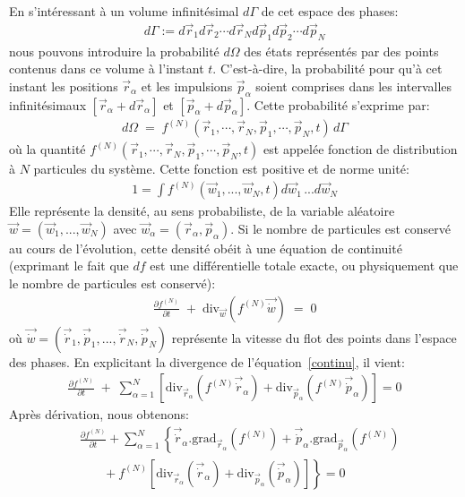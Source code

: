En s'intéressant à un volume infinitésimal $d\Gamma$ de cet espace des phases:
\begin{align*}
	d\Gamma:=d\vec{r}_{1}d\vec{r}_{2}\cdots d\vec{r}_{N}d\vec{p}_{1}d\vec{p}_{2}\cdots d\vec{p}_{N}
\end{align*}
nous pouvons introduire la probabilité $d\Omega$ des états représentés par des points contenus dans ce volume à l'instant $t$. C'est-à-dire, la probabilité
pour qu'à cet instant les positions $\vec{r}_{\alpha}$ et les {impulsion}s $\vec{p}_{\alpha}$ soient comprises dans les intervalles
infinitésimaux $[\vec{r}_{\alpha }+d\vec{r}_{\alpha}]$ et $[\vec{p}_{\alpha}+d\vec{p}_{\alpha}]$. Cette probabilité s'exprime
par:
\begin{align*}
	d\Omega\;=\;f^{(N)}(\vec{r}_{1},\cdots,\vec{r}_{N},\vec{p}_{1},\cdots,\vec{p}_{N},t)\,d\Gamma
\end{align*}
où la quantité $f^{(N)}(\vec{r}_{1},\cdots,\vec{r} _{N},\vec{p}_{1},\cdots,\vec{p}_{N},t)$ est appelée fonction de distribution à $N$
particules du système. Cette fonction est positive et de norme unité:
\begin{align*}
	1=\int f^{\left(N\right)}\left(\vec{w}_{1},...,\vec{w}_{N},t\right)d\vec{w}_{1}\,...d\vec{w}_{N}
\end{align*}
Elle représente la densité, au sens probabiliste, de la variable aléatoire $\vec{w}=(\vec{w}_{1},...,\vec{w}_{N})$ avec
$\vec{w}_{\alpha}=\left(  \vec{r}_{\alpha},\vec{p}_{\alpha}\right) $. Si le nombre de particules est conservé au cours de l'évolution, cette
densité obéit à une équation de continuité (exprimant le fait que $df$ est une différentielle totale exacte, ou physiquement que le nombre de
particules est conservé):
\begin{align}
	\frac{\partial f^{(N)}}{\partial t}\;+\;\mathrm{div}_{\vec{w}}(f^{(N)}\vec{\dot{w}})\;=\;0\label{continu}%
\end{align}
où $\vec{\dot{w}}=(\vec{\dot{r}}_{1},\vec{\dot{p}}_{1} ,...,\vec{\dot{r}}_{N},\vec{\dot{p}}_{N})$ représente la vitesse du flot des
points dans l'espace des phases. En explicitant la divergence de l'équation~\ref{continu}, il vient:
\begin{align*}
	\frac{\partial f^{(N)}}{\partial t}\;+\;\sum_{\alpha=1}^{N}\left[\mathrm{div}_{\vec{r}_{\alpha}}\left(  f^{(N)}\vec{\dot{r}}_{\alpha
	}\right)  +\mathrm{div}_{\vec{p}_{\alpha}}\left(  f^{(N)}\vec{\dot{p}}_{\alpha}\right)  \right]=0
\end{align*}
Après dérivation, nous obtenons:
\begin{align*}
	&  \frac{\partial f^{(N)}}{\partial t}+\displaystyle\sum\limits_{\alpha=1}%
	^{N}\left\{  \vec{\dot{r}}_{\alpha}.\mathrm{grad}_{\vec{r}_{\alpha}%
	}\left(  f^{(N)}\right)  +\vec{\dot{p}}_{\alpha}.\mathrm{grad}%
	_{\vec{p}_{\alpha}}\left(  f^{(N)}\right)  \right. \\
	&  \,\;\;\;\;\;\;\;\left.  +~f^{(N)}\left[  \mathrm{div}_{\vec{r}_{\alpha}%
	}\left(  \vec{\dot{r}}_{\alpha}\right)  +\mathrm{div}_{\vec{p}_{\alpha}%
	}\left(  \vec{\dot{p}}_{\alpha}\right)  \right]  \right\}=0
\end{align*}
